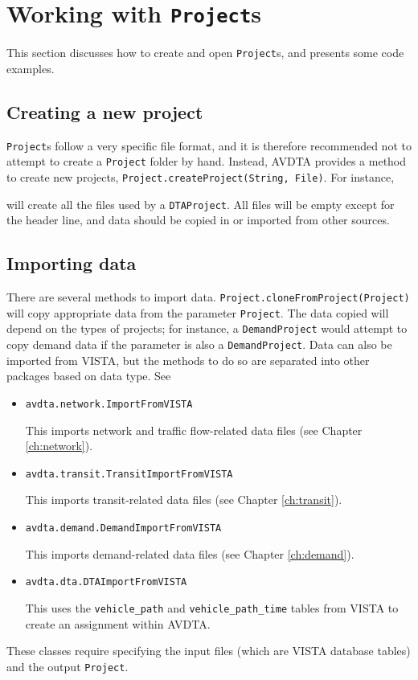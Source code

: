 \section{Working with \texttt{Project}s}

This section discusses how to create and open \texttt{Project}s, and presents some code examples.

\subsection{Creating a new project}
\texttt{Project}s follow a very specific file format, and it is therefore recommended not to attempt to create a \texttt{Project} folder by hand. Instead, AVDTA provides a method to create new projects, \texttt{Project.createProject(String, File)}. For instance,
\begin{algorithmic}[1]
\end{algorithmic}
will create all the files used by a \texttt{DTAProject}. All files will be empty except for the header line, and data should be copied in or imported from other sources. 

\subsection{Importing data}
There are several methods to import data. \texttt{Project.cloneFromProject(Project)} will copy appropriate data from the parameter \texttt{Project}. The data copied will depend on the types of projects; for instance, a \texttt{DemandProject} would attempt to copy demand data if the parameter is also a \texttt{DemandProject}. Data can also be imported from VISTA\cite{ziliaskopoulos2000internet}, but the methods to do so are separated into other packages based on data type. See
%
\begin{itemize}
	
\item \texttt{avdta.network.ImportFromVISTA}

This imports network and traffic flow-related data files (see Chapter \ref{ch:network}).

\item \texttt{avdta.transit.TransitImportFromVISTA}

This imports transit-related data files (see Chapter \ref{ch:transit}).

\item \texttt{avdta.demand.DemandImportFromVISTA}

This imports demand-related data files (see Chapter \ref{ch:demand}).

\item \texttt{avdta.dta.DTAImportFromVISTA}

This uses the \texttt{vehicle\_path} and \texttt{vehicle\_path\_time} tables from VISTA to create an assignment within AVDTA.
\end{itemize}
These classes require specifying the input files (which are VISTA database tables) and the output \texttt{Project}.

